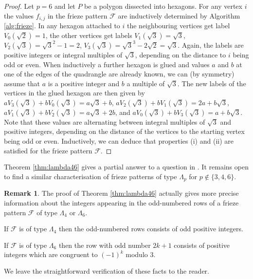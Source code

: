 \documentclass[11pt,a4paper]{amsart}
\theoremstyle{definition}
\newtheorem{Remark}[Lemma]{Remark}
\numberwithin{equation}{section}
\begin{document}
\begin{proof}
Let $p=6$ and let $P$ be a polygon dissected into hexagons.
For any vertex $i$ the values $f_{i,j}$
in the frieze pattern $\mathcal{F}$ are inductively determined by Algorithm \ref{alg:frieze}. In any 
hexagon attached to $i$ the neighbouring vertices get label $V_0(\sqrt{2})=1$, the other vertices 
get labels $V_1(\sqrt{3})=\sqrt{3}$, $V_2(\sqrt{3})=\sqrt{3}^2-1= 2$, 
$V_3(\sqrt{3})= \sqrt{3}^3-2\sqrt{2}=\sqrt{3}$. Again, the labels are positive integers or integral multiples 
of $\sqrt{3}$, depending on the distance to $i$ being odd or even. When inductively a further 
hexagon is glued and values $a$ and $b$ at one of the edges of the quadrangle are already known, we
can (by symmetry) assume that $a$ is a positive integer and $b$ a multiple of $\sqrt{3}$. 
The new labels of the vertices in the glued hexagon are then given by 
$aV_3(\sqrt{3})+bV_0(\sqrt{3})=a\sqrt{3}+b$,
$aV_2(\sqrt{3})+bV_1(\sqrt{3})=2a+b\sqrt{3}$,
$aV_1(\sqrt{3})+bV_2(\sqrt{3})=a\sqrt{3}+2b$, and
$aV_0(\sqrt{3})+bV_3(\sqrt{3})=a+b\sqrt{3}$.
Note that these values are alternating between integral multiples of $\sqrt{3}$ and positive integers,
depending on the distance of the vertices to the starting vertex being odd or even. Inductively, 
we can deduce that properties (i) and (ii) are satisfied for the frieze pattern $\mathcal{F}$. 
\end{proof}

Theorem \ref{thm:lambda46} gives a partial answer to a question in \cite[Section 7, Question (i)]{HJ17}.
It remains open to find a similar characterisation of frieze patterns of type $\Lambda_p$
for $p\not\in \{3,4,6\}$. 


\begin{Remark} The proof of Theorem \ref{thm:lambda46} actually gives more precise 
information about the integers appearing in the odd-numbered rows of a frieze pattern $\mathcal{F}$ of type
$\Lambda_4$ or $\Lambda_6$. 

If $\mathcal{F}$ is of type $\Lambda_4$ then the odd-numbered rows consists of odd positive integers. 

If $\mathcal{F}$ is of type $\Lambda_6$ then the row with odd number $2k+1$ consists of 
positive integers which are congruent to $(-1)^k$ modulo 3. 

We leave the straightforward verification of these facts to the reader.   
\end{Remark}


\end{document}
